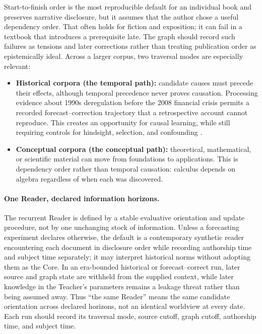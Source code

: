 Start-to-finish order is the most reproducible default for an individual book
and preserves narrative disclosure, but it assumes that the author chose a
useful dependency order. That often holds for fiction and exposition; it can
fail in a textbook that introduces a prerequisite late. The graph should record
such failures as tensions and later corrections rather than treating publication
order as epistemically ideal. Across a larger corpus, two traversal modes are
especially relevant:

\begin{itemize}[leftmargin=*]
    \item \textbf{Historical corpora (the temporal path):} candidate causes
    must precede their effects, although temporal precedence never proves
    causation. Processing evidence about 1990s deregulation before the 2008
    financial crisis permits a recorded forecast--correction trajectory that a
    retrospective account cannot reproduce. This creates an opportunity for
    causal learning, while still requiring controls for hindsight, selection,
    and confounding \cite{westerberg2026thl}.
    \item \textbf{Conceptual corpora (the conceptual path):} theoretical,
    mathematical, or scientific material can move from foundations to
    applications. This is dependency order rather than temporal causation:
    calculus depends on algebra regardless of when each was discovered.
\end{itemize}

\paragraph{One Reader, declared information horizons.} The recurrent Reader is
defined by a stable evaluative orientation and update procedure, not by one
unchanging stock of information. Unless a forecasting experiment declares
otherwise, the default is a contemporary synthetic reader encountering each
document in disclosure order while recording authorship time and subject time
separately; it may interpret historical norms without adopting them as the
Core. In an era-bounded historical or forecast--correct run, later source and
graph state are withheld from the supplied context, while later knowledge in
the Teacher's parameters remains a leakage threat rather than being assumed
away. Thus ``the same Reader'' means the same candidate orientation across
declared horizons, not an identical worldview at every date. Each run should
record its traversal mode, source cutoff, graph cutoff, authorship time, and
subject time.


